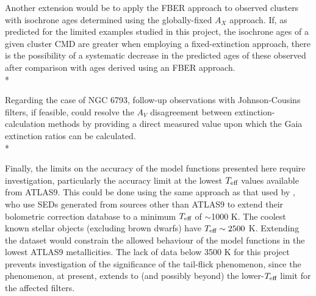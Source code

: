 \documentclass[12pt, a4paper]{report}
\begin{document}
Another extension would be to apply the FBER approach to observed clusters with isochrone ages determined using the globally-fixed $A_{X}$ approach. If, as predicted for the limited examples studied in this project, the isochrone ages of a given cluster CMD are greater when employing a fixed-extinction approach, there is the possibility of a systematic decrease in the predicted ages of these observed after comparison with ages derived using an FBER approach.\\*

Regarding the case of NGC 6793, follow-up observations with Johnson-Cousins filters, if feasible, could resolve the $A_{V}$ disagreement between extinction-calculation methods by providing a direct measured value upon which the Gaia extinction ratios can be calculated.\\*

Finally, the limits on the accuracy of the model functions presented here require investigation, particularly the accuracy limit at the lowest $T_{\textnormal{eff}}$ values available from ATLAS9. This could be done using the same approach as that used by \cite{2008PASP..120..583G}, who use SEDs generated from sources other than ATLAS9 to extend their bolometric correction database to a minimum $T_{\textnormal{eff}}$ of $\sim$1000 K. The coolest known stellar objects (excluding brown dwarfs) have $T_{\textnormal{eff}} \sim 2500$ K. Extending the dataset would constrain the allowed behaviour of the model functions in the lowest ATLAS9 metallicities. The lack of data below 3500 K for this project prevents investigation of the significance of the tail-flick phenomenon, since the phenomenon, at present, extends to (and possibly beyond) the lower-$T_{\textnormal{eff}}$ limit for the affected filters.

%

\end{document}
